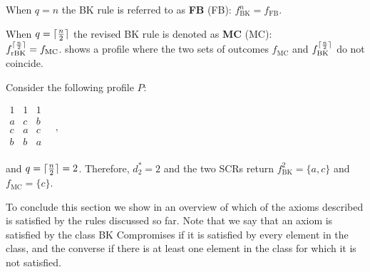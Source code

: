 When $q=n$ the BK rule is referred to as \textbf{\acl{FB}} (\acs{FB}): $f_{\text{BK}}^{n}= f_{\text{FB}}$.

When $q=\lceil\frac{n}{2}\rceil$ the revised BK rule is denoted as \textbf{\acl{MC}} (\acs{MC}): 
\\$f_{\text{rBK}}^{\lceil\frac{n}{2}\rceil}= f_{\text{MC}}$. 
 shows a profile where the two sets of outcomes $f_{\text{MC}}$ and $f_{\text{BK}}^{\lceil\frac{n}{2}\rceil}$ do not coincide.

\begin{example}
	\label{ex:BKvsMC}
	Consider the following profile $P$:
	\begin{center}
		$
		\begin{array}{ccc}
			1 & 1 & 1 \\
			a &	c & b \\
			c &	a & c \\
			b &	b & a \\
		\end{array} \quad, 
		$
	\end{center}
	and $q=\lceil\frac{n}{2}\rceil=2$. Therefore, $d_{2}^{*}=2$ and the two \acp{SCR} return $f_{\text{BK}}^{2}=\{a,c\}$ and $f_{\text{MC}}=\{c\}$.
\end{example}


To conclude this section we show in  an overview of which of the axioms described is satisfied by the rules discussed so far. Note that we say that an axiom is satisfied by the class \acs{BK} Compromises if it is satisfied by every element in the class, and the converse if there is at least one element in the class for which it is not satisfied.

